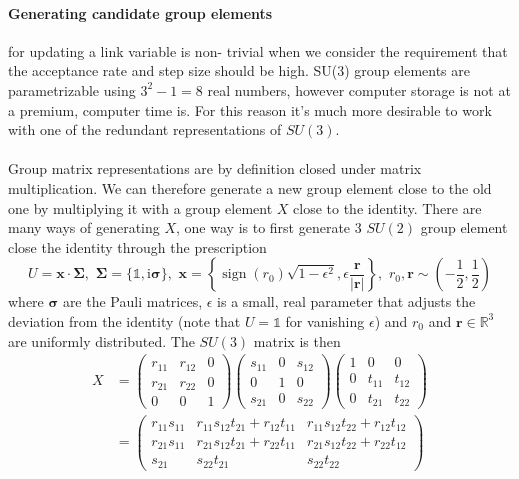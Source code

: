 \documentclass[a4paper,10pt]{book}
\begin{document}
\paragraph{Generating candidate group elements} for updating a link variable is non- trivial when we consider the requirement that the acceptance rate and step size should be high. SU(3) group elements are parametrizable using $3^2-1 = 8$ real numbers, however computer storage is not at a premium, computer time is. For this reason it's much more desirable to work with one of the redundant representations of $SU(3)$.\\\\Group matrix representations are by definition closed under matrix multiplication. We can therefore generate a new group element close to the old one by multiplying it with a group element $X$ close to the identity. There are many ways of generating $X$, one way is to first generate 3 $SU(2)$ group element close the identity through the prescription
\begin{equation}
U=\boldsymbol{x} \cdot \boldsymbol{\Sigma}, \,\,\boldsymbol{\Sigma} = \{\mathbb{1},\mathrm{i}\boldsymbol{\sigma} \},\,\,\boldsymbol{x} = \left\{\operatorname{sign}(r_0)\sqrt{1-\epsilon^2},\epsilon \frac{\boldsymbol{r}}{|\boldsymbol{r}|}  \right\},\,\,r_0,\boldsymbol{r} \sim \left( -\frac{1}{2},\frac{1}{2} \right)
\end{equation}
where $\boldsymbol{\sigma}$ are the Pauli matrices, $\epsilon$ is a small, real parameter that adjusts the deviation from the identity (note that $U=\mathbb{1}$ for vanishing $\epsilon$) and $r_0$ and $\boldsymbol{r}\in \mathbb{R}^3$ are uniformly distributed. The $SU(3)$ matrix is then
\begin{equation}
\begin{aligned} 
X&=\left(\begin{array}{ccc}
r_{11} & r_{12} & 0 \\
r_{21} & r_{22} & 0 \\
0 & 0 & 1
\end{array}\right)\left(\begin{array}{ccc}
s_{11} & 0 & s_{12} \\
0 & 1 & 0 \\
s_{21} & 0 & s_{22}
\end{array}\right)\left(\begin{array}{lcc}
1 & 0 & 0 \\
0 & t_{11} & t_{12} \\
0 & t_{21} & t_{22}
\end{array}\right)\\
&=\left(\begin{array}{ccc}
r_{11} s_{11} & r_{11} s_{12} t_{21}+r_{12} t_{11} & r_{11} s_{12} t_{22}+r_{12} t_{12} \\
r_{21} s_{11} & r_{21} s_{12} t_{21}+r_{22} t_{11} & r_{21} s_{12} t_{22}+r_{22} t_{12} \\
s_{21} & s_{22} t_{21} & s_{22} t_{22}
\end{array}\right)
\end{aligned}
\end{equation}
\end{document}
